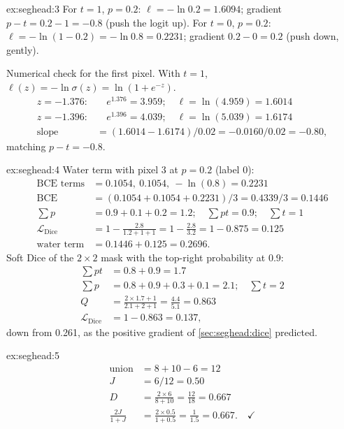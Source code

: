 \begin{solution}{ex:seghead:3}
For $t = 1$, $p = 0.2$: $\ell = -\ln 0.2 = 1.6094$; gradient $p - t = 0.2 - 1 = -0.8$ (push the logit up).
For $t = 0$, $p = 0.2$: $\ell = -\ln(1 - 0.2) = -\ln 0.8 = 0.2231$; gradient $0.2 - 0 = 0.2$ (push down, gently).

Numerical check for the first pixel. With $t = 1$, $\ell(z) = -\ln\sigma(z) = \ln(1 + e^{-z})$.
\begin{align*}
  z = -1.376:&\quad e^{1.376} = 3.959;\quad \ell = \ln(4.959) = 1.6014\\
  z = -1.396:&\quad e^{1.396} = 4.039;\quad \ell = \ln(5.039) = 1.6174\\
  \text{slope} &= (1.6014 - 1.6174) / 0.02 = -0.0160 / 0.02 = -0.80,
\end{align*}
matching $p - t = -0.8$.
\end{solution}

\begin{solution}{ex:seghead:4}
Water term with pixel 3 at $p = 0.2$ (label 0):
\begin{align*}
  \text{BCE terms} &= 0.1054,\ 0.1054,\ -\ln(0.8) = 0.2231\\
  \mathrm{BCE} &= (0.1054 + 0.1054 + 0.2231)/3 = 0.4339 / 3 = 0.1446\\
  \textstyle\sum p &= 0.9 + 0.1 + 0.2 = 1.2;\quad \sum pt = 0.9;\quad \sum t = 1\\
  \mathcal{L}_{\text{Dice}} &= 1 - \frac{2.8}{1.2 + 1 + 1} = 1 - \frac{2.8}{3.2} = 1 - 0.875 = 0.125\\
  \text{water term} &= 0.1446 + 0.125 = 0.2696.
\end{align*}
Soft Dice of the $2 \times 2$ mask with the top-right probability at 0.9:
\begin{align*}
  \textstyle\sum pt &= 0.8 + 0.9 = 1.7\\
  \textstyle\sum p &= 0.8 + 0.9 + 0.3 + 0.1 = 2.1;\quad \sum t = 2\\
  Q &= \frac{2 \times 1.7 + 1}{2.1 + 2 + 1} = \frac{4.4}{5.1} = 0.863\\
  \mathcal{L}_{\text{Dice}} &= 1 - 0.863 = 0.137,
\end{align*}
down from 0.261, as the positive gradient of \cref{sec:seghead:dice} predicted.
\end{solution}

\begin{solution}{ex:seghead:5}
\begin{align*}
  \text{union} &= 8 + 10 - 6 = 12\\
  J &= 6 / 12 = 0.50\\
  D &= \frac{2 \times 6}{8 + 10} = \frac{12}{18} = 0.667\\
  \frac{2J}{1 + J} &= \frac{2 \times 0.5}{1 + 0.5} = \frac{1}{1.5} = 0.667. \quad\checkmark
\end{align*}
\end{solution}


